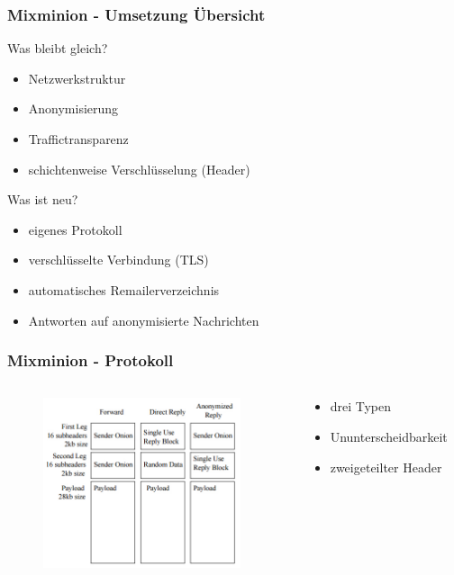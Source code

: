 \documentclass{beamer}
\begin{document}
\begin{frame}
	\frametitle{Mixminion - Umsetzung Übersicht}

	\begin{block}{Was bleibt gleich?}
		\begin{itemize}
			\item Netzwerkstruktur
			\item Anonymisierung
			\item Traffictransparenz
			\item schichtenweise Verschlüsselung (Header)
		\end{itemize}
	\end{block}

	\begin{block}{Was ist neu?}
		\begin{itemize}
			\item eigenes Protokoll
			\item verschlüsselte Verbindung (TLS)
			\item automatisches Remailerverzeichnis
			\item Antworten auf anonymisierte Nachrichten
		\end{itemize}
	\end{block}
\end{frame}

\begin{frame}
	\frametitle{Mixminion - Protokoll}

	\begin{columns}[T]
		\begin{column}{5cm}
			\begin{figure}
				\centering
				\includegraphics[height=5cm]{bilder/mixminion_messages.jpg}
			\end{figure}
		\end{column}
		\begin{column}{5cm}	
			\centering
			\begin{itemize}	
				\vspace{2cm}
				\item drei Typen
				\item Ununterscheidbarkeit
				\item zweigeteilter Header
			\end{itemize}
		\end{column}
	\end{columns}
\end{frame}
\end{document}
